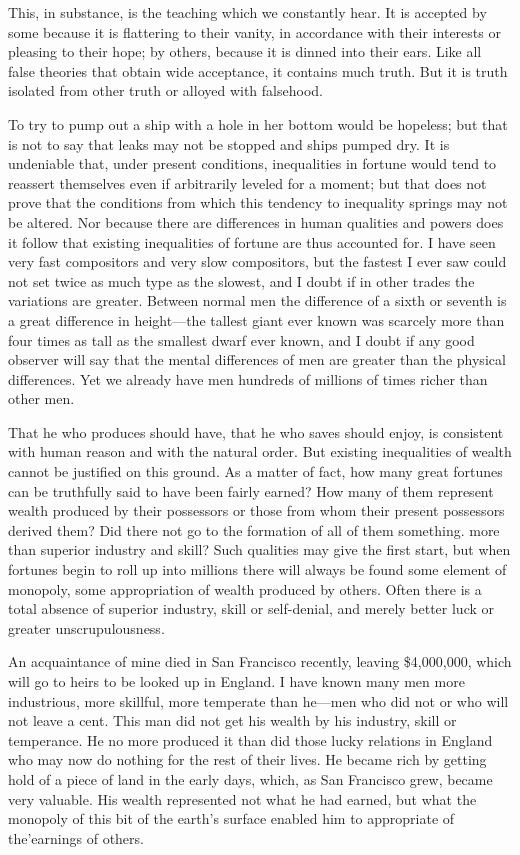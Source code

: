 \documentclass{book}
\begin{document}
This, in substance, is the teaching which we constantly hear. It is accepted by some because it is flattering to their vanity, in accordance with their interests or pleasing to their hope; by others, because it is dinned into their ears. Like all false theories that obtain wide acceptance, it contains much truth. But it is truth isolated from other truth or alloyed with falsehood.

To try to pump out a ship with a hole in her bottom would be hopeless; but that is not to say that leaks may not be stopped and ships pumped dry. It is undeniable that, under present conditions, inequalities in fortune would tend to reassert themselves even if arbitrarily leveled for a moment; but that does not prove that the conditions from which this tendency to inequality springs may not be altered. Nor because there are differences in human qualities and powers does it follow that existing inequalities of fortune are thus accounted for. I have seen very fast compositors and very slow compositors, but the fastest I ever saw could not set twice as much type as the slowest, and I doubt if in other trades the variations are greater. Between normal men the difference of a sixth or seventh is a great difference in height—the tallest giant ever known was scarcely more than four times as tall as the smallest dwarf ever known, and I doubt if any good observer will say that the mental differences of men are greater than the physical differences. Yet we already have men hundreds of millions of times richer than other men.

That he who produces should have, that he who saves should enjoy, is consistent with human reason and with the natural order. But existing inequalities of wealth cannot be justified on this ground. As a matter of fact, how many great fortunes can be truthfully said to have been fairly earned? How many of them represent wealth produced by their possessors or those from whom their present possessors derived them? Did there not go to the formation of all of them something. more than superior industry and skill? Such qualities may give the first start, but when fortunes begin to roll up into millions there will always be found some element of monopoly, some appropriation of wealth produced by others. Often there is a total absence of superior industry, skill or self-denial, and merely better luck or greater unscrupulousness.

An acquaintance of mine died in San Francisco recently, leaving \$4,000,000, which will go to heirs to be looked up in England. I have known many men more industrious, more skillful, more temperate than he—men who did not or who will not leave a cent. This man did not get his wealth by his industry, skill or temperance. He no more produced it than did those lucky relations in England who may now do nothing for the rest of their lives. He became rich by getting hold of a piece of land in the early days, which, as San Francisco grew, became very valuable. His wealth represented not what he had earned, but what the monopoly of this bit of the earth’s surface enabled him to appropriate of the’earnings of others.
\end{document}
